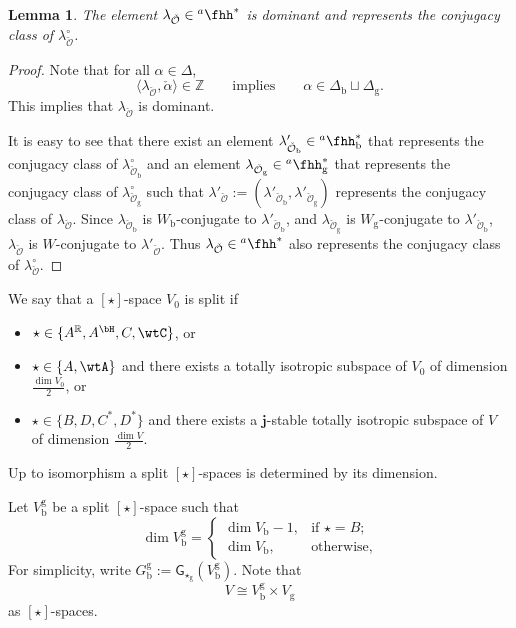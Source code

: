 \documentclass[12pt,a4paper]{amsart}
\newcommand{\CO}{{\mathcal {O}}}
\newcommand{\Z}{\mathbb{Z}}
\newcommand{\R}{\mathbb R}
\newcommand{\la}{\langle}
\newcommand{\ra}{\rangle}
\newcommand{\be}{\begin {equation}}
\newcommand{\ee}{\end {equation}}
\numberwithin{equation}{section}
\newtheorem{lem}[thm]{Lemma}
\theoremstyle{remark}
\def\hha{{}^a\fhh}
\begin{document}
 \begin{lem}\label{dmlam}
 The element $\lambda_{\check \CO}\in \hha^*$ is dominant and represents the conjugacy class of $\lambda_{\check \CO}^\circ$.
 \end{lem}
 \begin{proof}
 Note that for all $\alpha\in \Delta$,
 \[
   \la \lambda_{\check \CO}, \check \alpha\ra\in \Z \qquad \textrm{implies}\qquad \alpha\in \Delta_\mathrm b\sqcup \Delta_\mathrm g.
 \]
 This implies that $ \lambda_{\check \CO}$ is dominant.

  It is easy to see that there exist an element $\lambda'_{\check \CO_\mathrm b}\in \hha^*_\mathrm b$ that represents the conjugacy class of $\lambda_{\check \CO_\mathrm b}^\circ$ and an  element $\lambda_{\check \CO_\mathrm g}\in \hha^*_\mathrm g$ that represents the conjugacy class of $\lambda_{\check \CO_\mathrm g}^\circ$ such that
  $\lambda'_{\check \CO}:=(\lambda'_{\check \CO_\mathrm b}, \lambda'_{\check \CO_\mathrm g})$ represents the conjugacy class of $\lambda_{\check \CO}$.
  Since $\lambda_{\check \CO_\mathrm b}$ is $W_\mathrm b$-conjugate to $\lambda'_{\check \CO_\mathrm b}$, and $\lambda_{\check \CO_\mathrm g}$ is $W_\mathrm g$-conjugate
    to $\lambda'_{\check \CO_\mathrm b}$, $\lambda_{\check \CO}$ is $W$-conjugate to $\lambda'_{\check \CO}$. Thus $\lambda_{\check \CO}\in \hha^*$ also represents the conjugacy class of $\lambda_{\check \CO}^\circ$.

   \end{proof}


 We say that a $[\star]$-space $V_0$ is split if
\begin{itemize}
\item $\star\in \{A^\R, A^\bH, C, \wtC\}$, or

\item $\star\in \{A, \wtA\}$ and there exists a totally isotropic subspace of $V_0$ of dimension $\frac{\dim V_0}{2}$, or
\item
 $\star\in \{B, D, C^*, D^*\}$ and  there exists a $\mathbf j$-stable totally isotropic subspace of $V$ of dimension $\frac{\dim V}{2}$.
 \end{itemize}
Up to isomorphism a split $[\star]$-spaces is  determined by its dimension.


Let $V_{\mathrm b}^\mathrm g$ be a split $[\star]$-space such that
\[
 \dim V_{\mathrm b}^\mathrm g=
 \begin{cases}
   \dim V_{\mathrm b}-1,  &  \text{if $\star=B$};\\
   \dim V_{\mathrm b},    &  \text{otherwise},
    \end{cases}
 \]
For simplicity, write $G_\mathrm b^\mathrm g:=\mathsf G_{\star_\mathrm g}(V_\mathrm b^\mathrm g)$. Note that
\be\label{isostar}
  V\cong V_\mathrm b^\mathrm g \times V_\mathrm g
\ee
as $[\star]$-spaces.
\end{document}
